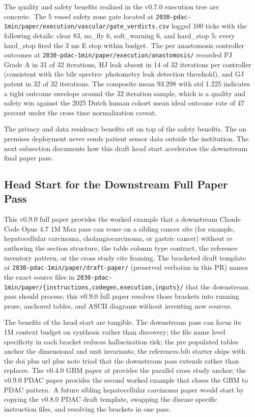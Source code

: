 The quality and safety benefits realized in the v0.7.0 execution
tree are concrete.\ The 5 vessel safety zone gate located at
\texttt{2030-pdac-1min/paper/execution/vascular/gate_verdicts.csv}
logged 100 ticks with the following details: clear 83, no_fly 6, soft_warning 6, and
hard_stop 5; every hard_stop fired the 3 ms E stop within budget.\
The per anastomosis controller outcomes at
\texttt{2030-pdac-1min/paper/execution/anastomosis/} recorded PJ
Grade A in 31 of 32 iterations, HJ leak absent in 14 of 32
iterations per controller (consistent with the bile spectro-
photometry leak detection threshold), and GJ patent in 32 of 32
iterations. The composite mean 93.298 with std 1.225 indicates a
tight outcome envelope around the 32 iteration sample, which is a
quality and safety win against the 2025 Dutch human cohort mean
ideal outcome rate of 47 percent \cite{DutchCohort2025Whipple}
under the cross time normalization caveat.

The privacy and data residency benefits sit on top of the safety
benefits. The on premises deployment never sends patient sensor
data outside the institution. The next subsection
documents how this draft head start accelerates the downstream
final paper pass.

\subsection{Head Start for the Downstream Full Paper Pass}
\label{sec:discussion-headstart}

This v0.9.0 full paper provides the worked example that a
downstream Claude Code Opus 4.7 1M Max pass can reuse on a
sibling cancer site (for example, hepatocellular carcinoma,
cholangiocarcinoma, or gastric cancer) without re authoring the
section structure, the table column type contract, the reference
inventory pattern, or the cross study cite framing. The bracketed
draft template at
\texttt{2030-pdac-1min/paper/draft-paper/} (preserved verbatim in
this PR) names the exact source files in
\texttt{2030-pdac-1min/paper/\{instructions,codegen,execution,inputs\}/} that the downstream pass should process; this v0.9.0
full paper resolves those brackets into running prose, anchored
tables, and ASCII diagrams without inventing new sources.

The benefits of the head start are tangible. The downstream pass
can focus its 1M context budget on synthesis rather than
discovery; the file name level specificity in each bracket
reduces hallucination risk; the pre populated tables anchor the
dimensional and unit invariants; the references.bib starter ships
with the doi plus url plus note triad that the downstream pass
extends rather than replaces. The v0.4.0 GBM paper at
\cite{kawchak_2026_20113157} provides the parallel cross study
anchor; the v0.9.0 PDAC paper provides the second worked example
that closes the GBM to PDAC pattern.\ A future sibling
hepatocellular carcinoma paper would start by copying the v0.8.0
PDAC draft template, swapping the disease specific instruction
files, and resolving the brackets in one pass.

